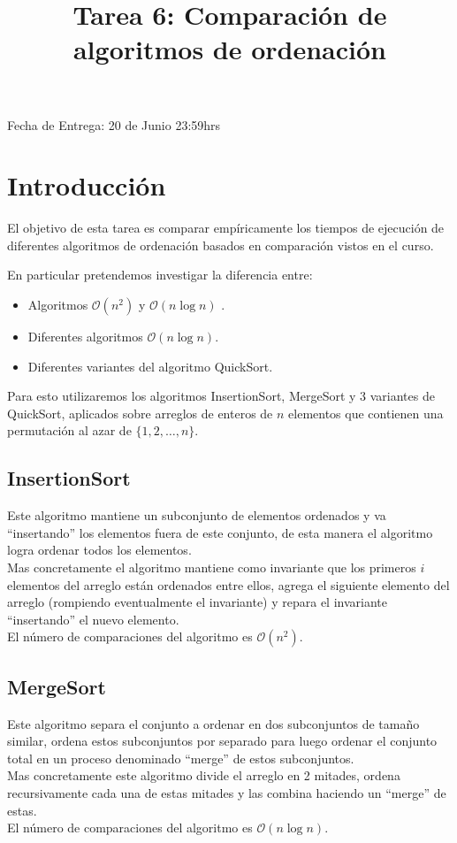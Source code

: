 \documentclass[dcc]{fcfmcourse}
\title{Tarea 6: Comparación de algoritmos de ordenación}
\begin{document}
\maketitle
\vspace{-2ex}
\begin{center}
Fecha de Entrega: 20 de Junio  23:59hrs \\
\end{center}


\section{Introducción}

El objetivo de esta tarea es comparar empíricamente los tiempos de ejecución de diferentes algoritmos de ordenación basados en comparación vistos en el curso.

En particular pretendemos investigar la diferencia entre:
\begin{itemize}
\item Algoritmos $\mathcal{O}(n^2)$  y $\mathcal{O}(n \log n)$ .
\item Diferentes algoritmos $\mathcal{O}(n \log n)$.
\item Diferentes variantes del algoritmo QuickSort.
\end{itemize}

Para esto utilizaremos los algoritmos InsertionSort, MergeSort y 3 variantes de QuickSort, aplicados sobre arreglos de enteros de $n$ elementos que contienen una permutación al azar de $\lbrace 1, 2, \ldots , n \rbrace$.
\subsection*{InsertionSort}
Este algoritmo mantiene un subconjunto de elementos ordenados y va ``insertando'' los elementos fuera de este conjunto, de esta manera el algoritmo logra ordenar todos los elementos.\\
Mas concretamente el algoritmo mantiene como invariante que los primeros $i$ elementos del arreglo están ordenados entre ellos, agrega el siguiente elemento del arreglo (rompiendo eventualmente el invariante) y repara el invariante ``insertando'' el nuevo elemento.\\
El número de comparaciones del algoritmo es $\mathcal{O}(n^2)$.

\subsection*{MergeSort}
Este algoritmo separa el conjunto a ordenar en dos subconjuntos de tamaño similar, ordena estos subconjuntos por separado para luego ordenar el conjunto total en un proceso denominado ``merge'' de estos subconjuntos.\\
Mas concretamente este algoritmo divide el arreglo en 2 mitades, ordena recursivamente cada una de estas mitades y las combina haciendo un ``merge'' de estas.\\
El número de comparaciones del algoritmo es $\mathcal{O}(n \log n)$.
\end{document}
